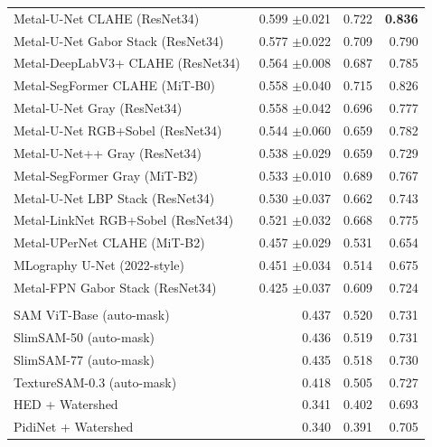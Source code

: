 \documentclass{article}
\begin{document}
\begin{table}[H]
\begin{tabularx}{\linewidth}{>{\raggedright\arraybackslash}Xrrr}
        Metal-U-Net CLAHE (ResNet34)~\citep{ronneberger2015u,he2016deep,zuiderveld1994clahe} & 0.599 {\tiny$\pm$0.021} & 0.722 & \textbf{0.836} \\
        Metal-U-Net Gabor Stack (ResNet34)~\citep{ronneberger2015u,he2016deep,daugman1985uncertainty} & 0.577 {\tiny$\pm$0.022} & 0.709 & 0.790 \\
        Metal-DeepLabV3+ CLAHE (ResNet34)~\citep{chen2018encoder,he2016deep,zuiderveld1994clahe} & 0.564 {\tiny$\pm$0.008} & 0.687 & 0.785 \\
        Metal-SegFormer CLAHE (MiT-B0)~\citep{xie2021segformer,zuiderveld1994clahe} & 0.558 {\tiny$\pm$0.040} & 0.715 & 0.826 \\
        Metal-U-Net Gray (ResNet34)~\citep{ronneberger2015u,he2016deep} & 0.558 {\tiny$\pm$0.042} & 0.696 & 0.777 \\
        Metal-U-Net RGB+Sobel (ResNet34)~\citep{ronneberger2015u,he2016deep} & 0.544 {\tiny$\pm$0.060} & 0.659 & 0.782 \\
        Metal-U-Net++ Gray (ResNet34)~\citep{zhou2018unetpp,he2016deep} & 0.538 {\tiny$\pm$0.029} & 0.659 & 0.729 \\
        Metal-SegFormer Gray (MiT-B2)~\citep{xie2021segformer} & 0.533 {\tiny$\pm$0.010} & 0.689 & 0.767 \\
        Metal-U-Net LBP Stack (ResNet34)~\citep{ronneberger2015u,he2016deep,ojala2002multiresolution} & 0.530 {\tiny$\pm$0.037} & 0.662 & 0.743 \\
        Metal-LinkNet RGB+Sobel (ResNet34)~\citep{chaurasia2017linknet,he2016deep} & 0.521 {\tiny$\pm$0.032} & 0.668 & 0.775 \\
        Metal-UPerNet CLAHE (MiT-B2)~\citep{xiao2018upernet,xie2021segformer,zuiderveld1994clahe} & 0.457 {\tiny$\pm$0.029} & 0.531 & 0.654 \\
        MLography U-Net (2022-style)~\citep{rusanovsky2022end,ronneberger2015u} & 0.451 {\tiny$\pm$0.034} & 0.514 & 0.675 \\
        Metal-FPN Gabor Stack (ResNet34)~\citep{lin2017fpn,he2016deep,daugman1985uncertainty} & 0.425 {\tiny$\pm$0.037} & 0.609 & 0.724 \\
        \midrule
        \multicolumn{4}{l}{\textbf{Foundation/Edge Add-ons (6)}} \\
        SAM ViT-Base (auto-mask)~\citep{kirillov2023segment} & 0.437 & 0.520 & 0.731 \\
        SlimSAM-50 (auto-mask)~\citep{chen2024slimsam} & 0.436 & 0.519 & 0.731 \\
        SlimSAM-77 (auto-mask)~\citep{chen2024slimsam} & 0.435 & 0.518 & 0.730 \\
        TextureSAM-0.3 (auto-mask)~\citep{rusanovsky2025texturesam} & 0.418 & 0.505 & 0.727 \\
        HED + Watershed~\citep{xie2015hed,beucher1979use} & 0.341 & 0.402 & 0.693 \\
        PidiNet + Watershed~\citep{su2021pidinet,beucher1979use} & 0.340 & 0.391 & 0.705 \\
        \bottomrule
    \end{tabularx}
\end{table}
\end{document}
